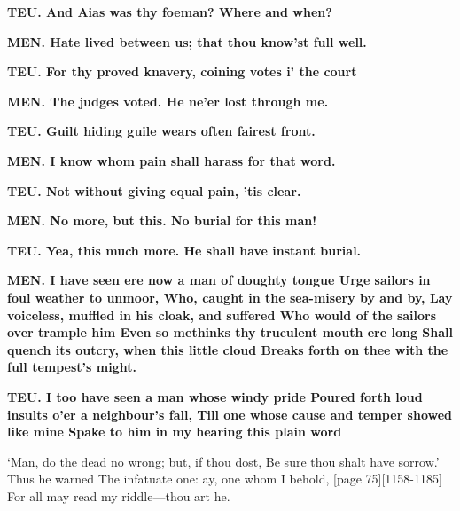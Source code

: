 \documentclass[11pt,letter]{book}
\begin{document}
\par \textbf{TEU. And Aias was thy foeman? Where and when?}
\par 

\par \textbf{MEN. Hate lived between us; that thou know’st full well.}
\par 

\par \textbf{TEU. For thy proved knavery, coining votes i’ the court}
\par 

\par \textbf{MEN. The judges voted. He ne’er lost through me.}
\par 

\par \textbf{TEU. Guilt hiding guile wears often fairest front.}
\par 

\par \textbf{MEN. I know whom pain shall harass for that word.}
\par 

\par \textbf{TEU. Not without giving equal pain, ’tis clear.}
\par 

\par \textbf{MEN. No more, but this. No burial for this man!}
\par 

\par \textbf{TEU. Yea, this much more. He shall have instant burial.}
\par 

\par \textbf{MEN. I have seen ere now a man of doughty tongue Urge sailors in foul weather to unmoor, Who, caught in the sea-misery by and by, Lay voiceless, muffled in his cloak, and suffered Who would of the sailors over trample him Even so methinks thy truculent mouth ere long Shall quench its outcry, when this little cloud Breaks forth on thee with the full tempest’s might.}
\par 

\par \textbf{TEU. I too have seen a man whose windy pride Poured forth loud insults o’er a neighbour’s fall, Till one whose cause and temper showed like mine Spake to him in my hearing this plain word}
\par   ‘Man, do the dead no wrong; but, if thou dost, Be sure thou shalt have sorrow.’ Thus he warned The infatuate one:  ay, one whom I behold, [page 75][1158-1185] For all may read my riddle—thou art he.
\end{document}

